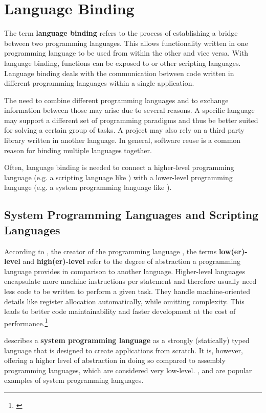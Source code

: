 \chapter{Language Binding}
\label{chap:LanguageBinding}

The term \textbf{language binding} refers to the process of establishing a bridge between two programming languages. This allows functionality written in one programming language to be used from within the other and vice versa. With language binding,  functions can be exposed to  or other scripting languages. Language binding deals with the communication between code written in different programming languages within a single application.

The need to combine different programming languages and to exchange information between those may arise due to several reasons. A specific language may support a different set of programming paradigms and thus be better suited for solving a certain group of tasks. A project may also rely on a third party library written in another language. In general, software reuse is a common reason for binding multiple languages together.

Often, language binding is needed to connect a higher-level programming \linebreak language (e.g. a scripting language like ) with a lower-level programming language (e.g. a system programming language like ).

\section{System Programming Languages and Scripting Languages}

According to , the creator of the programming language , the terms \textbf{low(er)-level} and \textbf{high(er)-level} refer to the degree of abstraction a programming language provides in comparison to another language. Higher-level languages encapsulate more machine instructions per statement and therefore usually need less code to be written to perform a given task. They handle machine-oriented details like register allocation automatically, while omitting complexity. This leads to better code \linebreak maintainability and faster development at the cost of performance.\footnote{\citep{Ousterhout}}

 describes a \textbf{system programming language} as a strongly (statically) typed language that is designed to create applications from scratch. It is, however, offering a higher level of abstraction in doing so compared to assembly programming languages, which are considered very low-level. ,  and  are popular examples of system programming languages.

